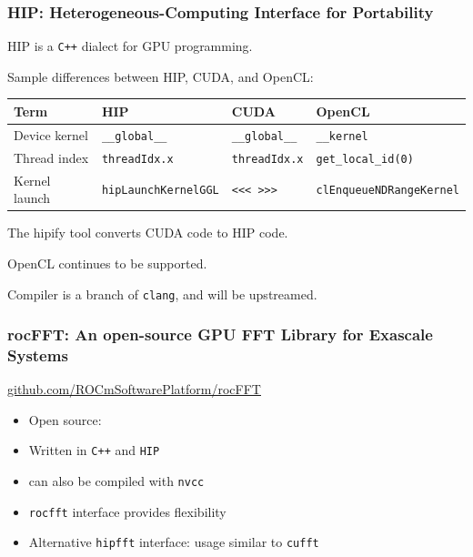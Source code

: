 \documentclass[10pt,aspectratio=169]{beamer}
\begin{document}
\begin{frame}
  \frametitle{HIP: Heterogeneous-Computing Interface for Portability}

  \begin{center}
    HIP is a \texttt{C++} dialect for GPU programming.
  \end{center}
  
  \bigskip
  
  \begin{center}
    Sample differences between HIP, CUDA, and OpenCL:
    \medskip
    
    \begin{tabular}{llll}
      Term & HIP & CUDA & OpenCL \\ \hline
      Device kernel &
      \lstinline[]$__global__$ &
      \lstinline[]$__global__$ &
      \lstinline[]$__kernel$ \\
      Thread index &
      \lstinline[]$threadIdx.x$ &
      \lstinline[]$threadIdx.x$ &
      \lstinline[]$get_local_id(0)$ \\
      Kernel launch &
      \lstinline[]$hipLaunchKernelGGL$ &
      \lstinline[]$<<< >>>$ &
      \lstinline[]$clEnqueueNDRangeKernel$ \\
    \end{tabular}
  \end{center}

  \bigskip
  
  \begin{center}
  The hipify tool converts CUDA code to HIP code.

  \medskip
  
  OpenCL continues to be supported.
  \end{center}

  \bigskip

  Compiler is a branch of \texttt{clang}, and will be upstreamed.
  
\end{frame}


\begin{frame}
    \frametitle{rocFFT: An open-source GPU FFT Library for Exascale Systems}

    \begin{center}
       \url{github.com/ROCmSoftwarePlatform/rocFFT}
    \end{center}

    \bigskip
    
    \begin{itemize}
    \item Open source:
      \medskip
    \item Written in \texttt{C++} and \texttt{HIP}
      \medskip
    \item can also be compiled with \texttt{nvcc}
      \medskip
    \item \texttt{rocfft} interface provides flexibility
      \medskip
    \item Alternative \texttt{hipfft} interface: usage similar to \texttt{cufft}
    \end{itemize}
    
\end{frame}
\end{document}
